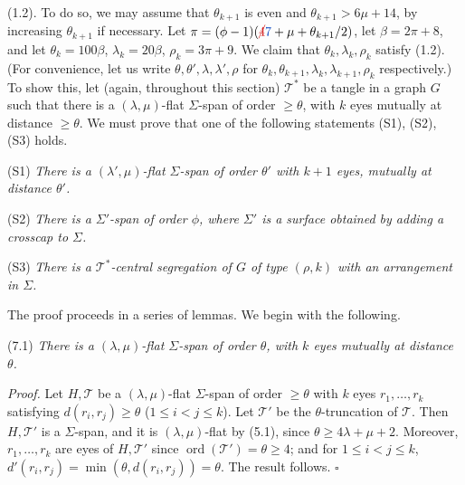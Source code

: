 \stmt
(1.2). To do so, we may assume that $\theta_{k+1}$ is even and $\theta_{k+1} > 6\mu + 14$, by increasing $\theta_{k+1}$ if necessary. Let $\pi = (\phi - 1)(\delm{4}\fix{7} + \mu + \theta_{k+1}/2)$, let $\beta = 2\pi + 8$, and let $\theta_k = 100\beta$, $\lambda_k = 20\beta$, $\rho_k = 3\pi + 9$. We claim that $\theta_k, \lambda_k, \rho_k$ satisfy (1.2). (For convenience, let us write $\theta, \theta', \lambda, \lambda', \rho$ for $\theta_k, \theta_{k+1}, \lambda_k, \lambda_{k+1}, \rho_k$ respectively.) To show this, let (again, throughout this section) $\mathcal{T}^*$ be a tangle in a graph $G$ such that there is a $(\lambda, \mu)$-flat $\Sigma$-span of order $\ge \theta$, with $k$ eyes mutually at distance $\ge \theta$. We must prove that one of the following statements (S1), (S2), (S3) holds.

\hspace*{12pt}(S1) \textit{There is a $(\lambda', \mu)$-flat $\Sigma$-span of order $\theta'$ with $k + 1$ eyes, mutually at distance $\theta'$.}

\hspace*{12pt}(S2) \textit{There is a $\Sigma'$-span of order $\phi$, where $\Sigma'$ is a surface obtained by adding a crosscap to $\Sigma$.}

\hspace*{12pt}(S3) \textit{There is a $\mathcal{T}^*$-central segregation of $G$ of type $(\rho, k)$ with an arrangement in $\Sigma$.}

The proof proceeds in a series of lemmas. We begin with the following.

\stmt
(7.1) \textit{There is a $(\lambda, \mu)$-flat $\Sigma$-span of order $\theta$, with $k$ eyes mutually at distance $\theta$.}

\textit{Proof.} Let $H, \mathcal{T}$ be a $(\lambda, \mu)$-flat $\Sigma$-span of order $\ge \theta$ with $k$ eyes $r_1, \ldots, r_k$ satisfying $d(r_i, r_j) \ge \theta$ ($1 \le i < j \le k$). Let $\mathcal{T}'$ be the $\theta$-truncation of $\mathcal{T}$. Then $H, \mathcal{T}'$ is a $\Sigma$-span, and it is $(\lambda, \mu)$-flat by (5.1), since $\theta \ge 4\lambda + \mu + 2$. Moreover, $r_1, \ldots, r_k$ are eyes of $H, \mathcal{T}'$ since $\operatorname{ord}(\mathcal{T}') = \theta \ge 4$; and for $1 \le i < j \le k$, $d'(r_i, r_j) = \min(\theta, d(r_i, r_j)) = \theta$. The result follows. $\square$

